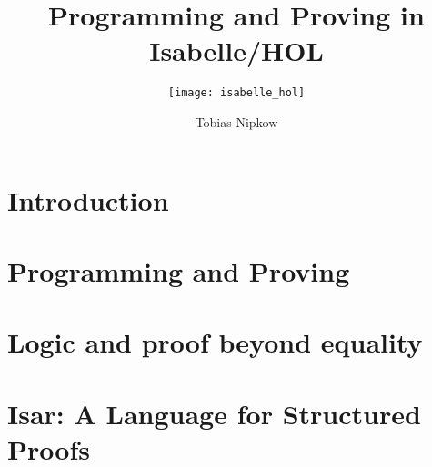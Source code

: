 \documentclass[envcountsame,envcountchap]{svmono}
\begin{document}
\title{Programming and Proving in Isabelle/HOL}
\subtitle{\texttt{[image: isabelle\_hol]}}
\author{Tobias Nipkow}
\maketitle

\frontmatter%

\setcounter{tocdepth}{1}
\tableofcontents


\mainmatter%


\chapter{Introduction}


\chapter{Programming and Proving}
\label{sec:FP}




%

\chapter{Logic and proof beyond equality}
\label{ch:Logic}


\chapter{Isar: A Language for Structured Proofs}
\label{ch:Isar}


\backmatter%




\end{document}
